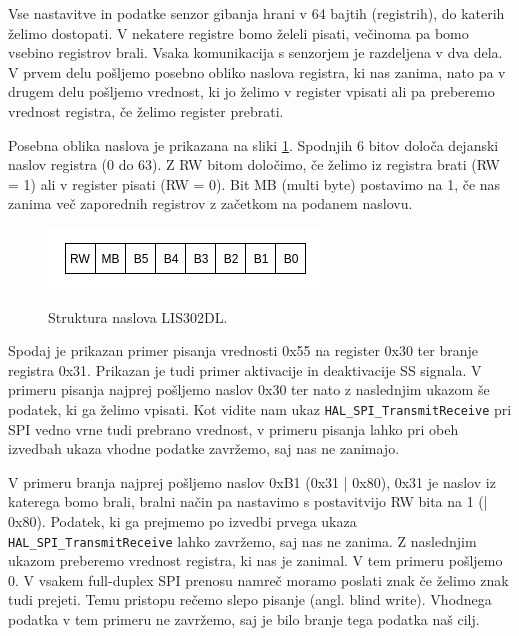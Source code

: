 \documentclass[12pt,letterpaper]{article}
\begin{document}
Vse nastavitve in podatke senzor gibanja hrani v 64 bajtih (registrih), do katerih želimo dostopati. V nekatere registre bomo želeli pisati, večinoma pa bomo vsebino registrov brali. Vsaka komunikacija s senzorjem je razdeljena v dva dela. V prvem delu pošljemo posebno obliko naslova registra, ki nas zanima, nato pa v drugem delu pošljemo vrednost, ki jo želimo v register vpisati ali pa preberemo vrednost registra, če želimo register prebrati.

Posebna oblika naslova je prikazana na sliki \ref{reg_LIS302DL}. Spodnjih 6 bitov določa dejanski naslov registra (0 do 63). Z RW bitom določimo, če želimo iz registra brati (RW = 1) ali v register pisati (RW = 0). Bit MB (multi byte) postavimo na 1, če nas zanima več zaporednih registrov z začetkom na podanem naslovu.

\begin{figure}[ht!]
  \centering
  \caption{Struktura naslova LIS302DL.}
  \includegraphics{images/vaja5/lis302DL.png}
  \label{reg_LIS302DL}
\end{figure}

Spodaj je prikazan primer pisanja vrednosti 0x55 na register 0x30 ter branje registra 0x31. Prikazan je tudi primer aktivacije in deaktivacije SS signala. V primeru pisanja najprej pošljemo naslov 0x30 ter nato z naslednjim ukazom še podatek, ki ga želimo vpisati. Kot vidite nam ukaz \texttt{HAL\_SPI\_TransmitReceive} pri SPI vedno vrne tudi prebrano vrednost, v primeru pisanja lahko pri obeh izvedbah ukaza vhodne podatke zavržemo, saj nas ne zanimajo.

V primeru branja najprej pošljemo naslov 0xB1 (0x31 | 0x80), 0x31 je naslov iz katerega bomo brali, bralni način pa nastavimo s postavitvijo RW bita na 1 (| 0x80). Podatek, ki ga prejmemo po izvedbi prvega ukaza \texttt{HAL\_SPI\_TransmitReceive} lahko zavržemo, saj nas ne zanima. Z naslednjim ukazom preberemo vrednost registra, ki nas je zanimal. V tem primeru pošljemo 0. V vsakem full-duplex SPI prenosu namreč moramo poslati znak če želimo znak tudi prejeti. Temu pristopu rečemo slepo pisanje (angl. blind write). Vhodnega podatka v tem primeru ne zavržemo, saj je bilo branje tega podatka naš cilj.
\end{document}
